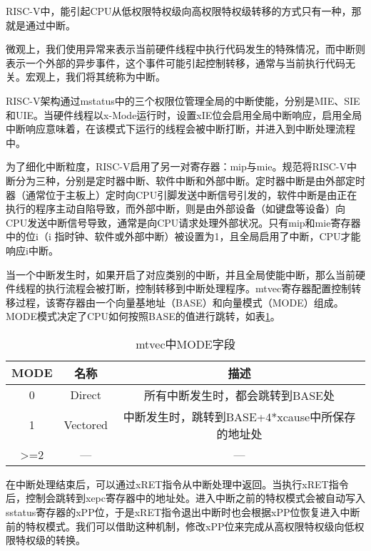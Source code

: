 RISC-V中，能引起CPU从低权限特权级向高权限特权级转移的方式只有一种，那就是通过中断。

微观上，我们使用异常来表示当前硬件线程中执行代码发生的特殊情况，而中断则表示一个外部的异步事件，这个事件可能引起控制转移，通常与当前执行代码无关。宏观上，我们将其统称为中断。

RISC-V架构通过mstatus中的三个权限位管理全局的中断使能，分别是MIE、SIE和UIE。当硬件线程以x-Mode运行时，设置xIE位会启用全局中断响应，启用全局中断响应意味着，在该模式下运行的线程会被中断打断，并进入到中断处理流程中。

为了细化中断粒度，RISC-V启用了另一对寄存器：mip与mie。规范将RISC-V中断分为三种，分别是定时器中断、软件中断和外部中断。定时器中断是由外部定时器（通常位于主板上）定时向CPU引脚发送中断信号引发的，软件中断是由正在执行的程序主动自陷导致，而外部中断，则是由外部设备（如键盘等设备）向CPU发送中断信号导致，通常是向CPU请求处理外部状况。只有mip和mie寄存器中的位i（i 指时钟、软件或外部中断）被设置为1，且全局启用了中断，CPU才能响应i中断。

当一个中断发生时，如果开启了对应类别的中断，并且全局使能中断，那么当前硬件线程的执行流程会被打断，控制转移到中断处理程序。mtvec寄存器配置控制转移过程，该寄存器由一个向量基地址（BASE）和向量模式（MODE）组成。MODE模式决定了CPU如何按照BASE的值进行跳转，如表\ref{tab:mtvec}。

\begin{table}[h]
	\centering
	\setlength{\belowcaptionskip}{2pt}
	\caption{mtvec中MODE字段}
	\label{tab:mtvec}
	\begin{tabular}{|c|c|c|}
		\hline
		MODE             & 名称       & 描述                                        \\ \hline
		0                & Direct   & 所有中断发生时，都会跳转到BASE处                        \\ \hline
		1                & Vectored & 中断发生时，跳转到BASE+4*xcause中所保存的地址处 \\ \hline
		\textgreater{}=2 & —        & —                                         \\ \hline
	\end{tabular}
\end{table}

在中断处理结束后，可以通过xRET指令从中断处理中返回。当执行xRET指令后，控制会跳转到xepc寄存器中的地址处。进入中断之前的特权模式会被自动写入 sstatus寄存器的xPP位，于是xRET指令退出中断时也会根据xPP位恢复进入中断前的特权模式。我们可以借助这种机制，修改xPP位来完成从高权限特权级向低权限特权级的转换。

